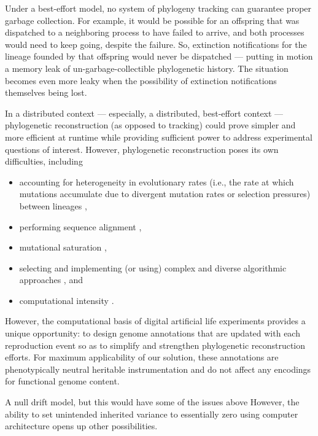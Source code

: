 Under a best-effort model, no system of phylogeny tracking can guarantee proper garbage collection.
For example, it would be possible for an offspring that was dispatched to a neighboring process to have failed to arrive, and both processes would need to keep going, despite the failure.
So, extinction notifications for the lineage founded by that offspring would never be dispatched --- putting in motion a memory leak of un-garbage-collectible phylogenetic history.
The situation becomes even more leaky when the possibility of extinction notifications themselves being lost.

In a distributed context --- especially, a distributed, best-effort context --- phylogenetic reconstruction (as opposed to tracking) could prove simpler and more efficient at runtime while providing sufficient power to address experimental questions of interest.
However, phylogenetic reconstruction poses its own difficulties, including
\begin{itemize}
\item accounting for heterogeneity in evolutionary rates (i.e., the rate at which mutations accumulate due to divergent mutation rates or selection pressures) between lineages \citep{lack2010identifying},
\item performing sequence alignment \citep{casci2008lining},
\item mutational saturation \citep{hagstrom2004using},
\item selecting and implementing (or using) complex and diverse algorithmic approaches \citep{kapli2020phylogenetic}, and
\item computational intensity \citep{sarkar2010hardware}.
\end{itemize}

However, the computational basis of digital artificial life experiments provides a unique opportunity: to design genome annotations that are updated with each reproduction event so as to simplify and strengthen phylogenetic reconstruction efforts.
For maximum applicability of our solution, these annotations are phenotypically neutral heritable instrumentation \citep{stanley2002evolving} and do not affect any encodings for functional genome content.

A null drift model, but this would have some of the issues above
However, the ability to set unintended inherited variance to essentially zero using computer architecture opens up other possibilities.

